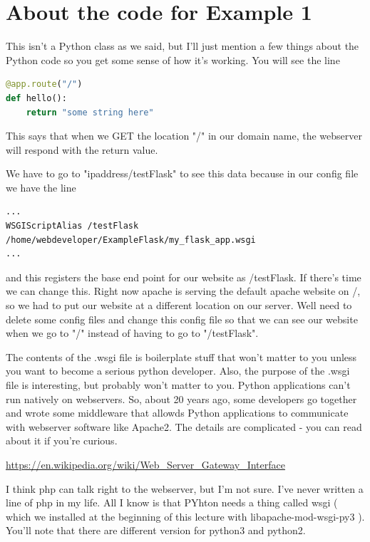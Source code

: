\documentclass[10pt]{article}
\begin{document}
\section{About the code for Example 1}
This isn't a Python class as we said, but I'll just mention a few things about the Python code so you get some sense of how it's working. You will see the line

\begin{lstlisting}[language=Python]
@app.route("/")
def hello():
	return "some string here"
\end{lstlisting}
 
This says that when we GET the location "/" in our domain name, the webserver will respond with the return value.

We have to go to "ipaddress/testFlask" to see this data because in our config file we have the line

\begin{lstlisting}
...
WSGIScriptAlias /testFlask /home/webdeveloper/ExampleFlask/my_flask_app.wsgi
...
\end{lstlisting}

and this registers the base end point for our website as /testFlask. If there's time we can change this. Right now apache is serving the default apache website on /, so we had to put our website at a different location on our server. Well need to delete some config files and change this config file so that we can see our website when we go to "/" instead of having to go to "/testFlask".

The contents of the .wsgi file is boilerplate stuff that won't matter to you unless you want to become a serious python developer. Also, the purpose of the .wsgi file is interesting, but probably won't matter to you. Python applications can't run natively on webservers. So, about 20 years ago, some developers go together and wrote some middleware that allowds Python applications to communicate with webserver software like Apache2. The details are complicated - you can read about it if you're curious. 

\url{https://en.wikipedia.org/wiki/Web_Server_Gateway_Interface}

I think php can talk right to the webserver, but I'm not sure. I've never written a line of php in my life. All I know is that PYhton needs a thing called wsgi ( which we installed at the beginning of this lecture with libapache-mod-wsgi-py3 ). You'll note that there are different version for python3 and python2.
\end{document}
